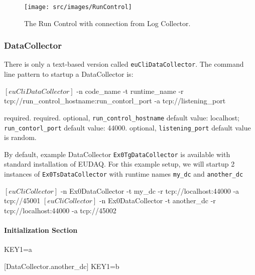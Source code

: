 \begin{figure}[htb]
  \begin{center}
    \texttt{[image: src/images/RunControl]}
    \caption{The Run Control with connection from Log Collector.}
    \label{fig:RunControl_con_log}
  \end{center}
\end{figure}


\subsubsection{DataCollector}
\label{sec:datacollector}
There is only a text-based version called \texttt{euCliDataCollector}.
The command line pattern to startup a DataCollector is:
\begin{listing}[mybash]
$[euCliDataCollector]$ -n {code_name} -t {runtime_name} -r tcp://{run_control_hostname}:{run_contorl_port} -a tcp://{listening_port}
\end{listing}

\begin{description}
required.
required.
optional, \texttt{run\_control\_hostname} default value: localhost;  \texttt{run\_contorl\_port}  default value: 44000.
optional, \texttt{listening\_port} default value is random.
\end{description}

By default, example DataCollector \texttt{Ex0TgDataCollector} is available with standard installation of EUDAQ.
For this example setup, we will startup 2 instances of \texttt{Ex0TsDataCollector} with runtime names \texttt{my\_dc} and \texttt{another\_dc}\\
\begin{listing}[mybash]
$[euCliCollector]$ -n Ex0DataCollector -t my_dc -r tcp://localhost:44000 -a tcp://45001
$[euCliCollector]$ -n Ex0DataCollector -t another_dc -r tcp://localhost:44000 -a tcp://45002
\end{listing}

\paragraph{Initialization Section}
\begin{listing}[conf]
[DataCollector.my_dc]
KEY1=a

[DataCollector.another_dc]
KEY1=b
\end{listing}

